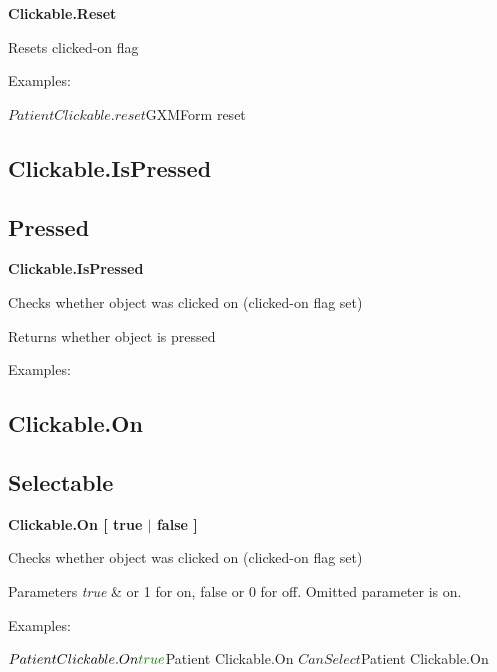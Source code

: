 {\bfseries  Clickable.\+Reset }

Resets clicked-\/on flag

Examples\+:
\begin{DoxyCode}
$Patient Clickable.reset
$GXMForm reset
\end{DoxyCode}
 



\subsection*{Clickable.\+Is\+Pressed }

\subsection*{Pressed }

{\bfseries  Clickable.\+Is\+Pressed }

Checks whether object was clicked on (clicked-\/on flag set) \begin{DoxyReturn}{Returns}
whether object is pressed
\end{DoxyReturn}
Examples\+:
 



\subsection*{Clickable.\+On }

\subsection*{Selectable }

{\bfseries  Clickable.\+On \mbox{[} true $\vert$ false \mbox{]} }

Checks whether object was clicked on (clicked-\/on flag set) 
\begin{DoxyParams}{Parameters}
{\em true} & or 1 for on, false or 0 for off. Omitted parameter is on.\\
\hline
\end{DoxyParams}
Examples\+:
\begin{DoxyCode}
$Patient Clickable.On \textcolor{keyword}{true}
$Patient Clickable.On $CanSelect
$Patient Clickable.On
\end{DoxyCode}
 



